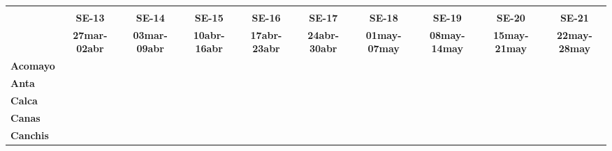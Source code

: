 \begin{tabular}{lccccccccc}
	\textbf{}              	  & \multicolumn{1}{l}{}                        & \multicolumn{1}{l}{}      & \multicolumn{1}{l}{}                         & \multicolumn{1}{l}{}                         & \multicolumn{1}{l}{}                         & \multicolumn{1}{l}{}                        & \multicolumn{1}{l}{}                         & \multicolumn{1}{l}{}                         & \multicolumn{1}{l}{}     \\
	\textbf{}                                                                          	
	&\textbf{SE-13} 							&\textbf{SE-14}
	&\textbf{SE-15}								&\textbf{SE-16}	
	&\textbf{SE-17}								&\textbf{SE-18}
	&\textbf{SE-19}								&\textbf{SE-20}	
	&\textbf{SE-21}\\
	\textbf{}              	  	
	&\textbf{27mar-02abr}
	&\textbf{03mar-09abr}						&\textbf{10abr-16abr}
	&\textbf{17abr-23abr}						&\textbf{24abr-30abr}
	&\textbf{01may-07may}						&\textbf{08may-14may}
	&\textbf{15may-21may}						&\textbf{22may-28may}\\
	\textbf{Acomayo}                        		
	&\cellcolor[HTML]{FCC46C}					&\cellcolor[HTML]{FCC46C}
	&\cellcolor[HTML]{FCC46C}					&\cellcolor[HTML]{FCC46C}
	&\cellcolor[HTML]{FCC46C}					&\cellcolor[HTML]{FCC46C}
	&\cellcolor[HTML]{FCC46C}					&\cellcolor[HTML]{FCC46C}
	&\cellcolor[HTML]{FCC46C} \\
	\textbf{Anta}                                                   		
	&\cellcolor[HTML]{FCC46C}					&\cellcolor[HTML]{FCC46C}
	&\cellcolor[HTML]{FCC46C}					&\cellcolor[HTML]{FCC46C}
	&\cellcolor[HTML]{FCC46C} 					&\cellcolor[HTML]{FCC46C}
	&\cellcolor[HTML]{FCC46C}					&\cellcolor[HTML]{FCC46C}
	&\cellcolor[HTML]{FCC46C}\\
	\textbf{Calca}      				       								            
	&\cellcolor[HTML]{FCC46C}		   			&\cellcolor[HTML]{FCC46C}		     		&\cellcolor[HTML]{FCC46C}					&\cellcolor[HTML]{FCC46C}			        &\cellcolor[HTML]{FCC46C}   				&\cellcolor[HTML]{FCC46C}					&\cellcolor[HTML]{FCC46C}					&\cellcolor[HTML]{FCC46C}	&\cellcolor[HTML]{FCC46C}\\             			
	\textbf{Canas}                              											
	&\cellcolor[HTML]{FCC46C}
	&\cellcolor[HTML]{FCC46C}					&\cellcolor[HTML]{FCC46C}
	&\cellcolor[HTML]{FCC46C} 					&\cellcolor[HTML]{FCC46C}
	&\cellcolor[HTML]{FCC46C}					&\cellcolor[HTML]{FCC46C}
	&\cellcolor[HTML]{FCC46C}					&\cellcolor[HTML]{FCC46C}\\
	\textbf{Canchis}                             											

\end{tabular}
